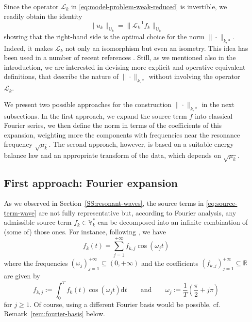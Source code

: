 \documentclass{amsart}
\theoremstyle{plain}
\theoremstyle{remark}
\numberwithin{equation}{section}
\numberwithin{theorem}{section}
\newcommand{\R}{\mathbb{R}}
\newcommand{\trial}{\mathbb{U}}
\newcommand{\data}{\mathbb{V}^*}
\newcommand{\dt}{\mathrm{d}t}
\begin{document}
Since the operator $\mathcal{L}_k$ in \eqref{eq:model-problem-weak-reduced} is invertible, we readily obtain the identity
\begin{equation}
\label{eq:optimal-data-norm}
\|u_k \|_{\trial_k} = \|\mathcal{L}_k^{-1} f_k\|_{\trial_k} 
\end{equation}
showing that the right-hand side is the optimal choice for the norm $\|\cdot\|_{k, *}$. Indeed, it makes $\mathcal{L}_k$ not only an isomorphism but even an isometry. This idea has been used in a number of recent references \cite{Bignardi.Moiola:25, Fuhrer.Gonzalez.Karkulik:25, Steinbach.Zank:22, Zank:20, Henning.Palitta.Simoncini.Urban:22}. Still, as we mentioned also in the introduction, we are interested in devising more explicit and operative equivalent definitions, that describe the nature of $\|\cdot\|_{k,*}$ without involving the operator $\mathcal{L}_k$. 

We present  two possible approaches for the construction $\|\cdot\|_{k,*}$  in the next subsections. In the first approach, we expand the source term $f$ into classical Fourier series,
we then define the norm in terms of the coefficients of this expansion, 
weighting more  the components with frequencies near the resonance frequency $\sqrt{\mu_k}$. The second approach, however, is 
based on a suitable energy balance law and an appropriate transform of 
the data, which depends on $\sqrt{\mu_k}$.


\subsection{First approach: Fourier expansion}
\label{SS:FourierExpansion}
As we observed in Section~\ref{SS:resonant-waves}, the source terms in \eqref{eq:source-term-wave} are not fully representative but, according to Fourier analysis, any admissible source term $f_k \in \data_k$ can be decomposed into an infinite combination of (some of) those ones. For instance, following \cite{Zank:20}, we have
\begin{equation}
	\label{eq:fourier-expansion}
	f_k(t) =\sum_{j=1}^{+\infty} f_{k,j}\cos(\omega_j t) 
\end{equation}
where the frequencies $(\omega_j)_{j=1}^{+\infty} \subseteq (0, +\infty)$ and the coefficients $(f_{k,j})_{j=1}^{+\infty} \subseteq \R$ are given by
\begin{equation}
\label{eq:fourier-expansion-coefficients}
	f_{k, j} := \int_0^T f_k(t)\cos(\omega_j t)\dt 
	\qquad \text{and} \qquad 
	\omega_j := \frac{1}{T}\left(\frac{\pi}{2}+j\pi\right)
\end{equation}
for $j \geq 1$. Of course, using a different Fourier basis would be possible, cf. Remark~\ref{rem:fourier-basis} below.
 
\end{document}
